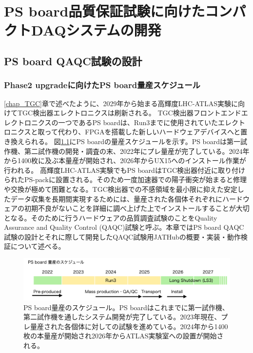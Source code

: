 \chapter{PS board品質保証試験に向けたコンパクトDAQシステムの開発}
\label{chap_QAQC}

\section{PS board QAQC試験の設計}
\label{sec_QAQCdesign}
\subsection{Phase2 upgradeに向けたPS board量産スケジュール}
\label{subsec_PSBschedule}
\ref{chap_TGC}章で述べたように、2029年から始まる高輝度LHC-ATLAS実験に向けてTGC検出器エレクトロニクスは刷新される。
TGC検出器フロントエンドエレクトロニクスの一つであるPS boardは、Run3までに使用されていたエレクトロニクスと取って代わり、FPGAを搭載した新しいハードウェアデバイスへと置き換えられる。
図\ref{PSBschedule}にPS boardの量産スケジュールを示す。PS boardは第一試作機、第二試作機の開発・調査の末、2022年にプレ量産が完了している。2024年から1400枚に及ぶ本量産が開始され、2026年からUX15へのインストール作業が行われる。
高輝度LHC-ATLAS実験でもPS boardはTGC検出器付近に取り付けられたPS-packに設置される。そのため一度加速器での陽子衝突が始まると修理や交換が極めて困難となる。TGC検出器での不感領域を最小限に抑えた安定したデータ収集を長期間実現するためには、量産された各個体それぞれにハードウェアの初期不良がないことを詳細に調べ上げた上でインストールすることが大切となる。そのために行うハードウェアの品質調査試験のことをQuality Assurance and Quality Control (QAQC)試験と呼ぶ。本章ではPS board QAQC試験の設計とそれに際して開発したQAQC試験用JATHubの概要・実装・動作検証について述べる。

\begin{figure} 
\centering
\includegraphics[width=16cm]{fig/QAQC/PSBschedule.png}
\caption[PS board量産のスケジュール]{PS board量産のスケジュール。PS boardはこれまでに第一試作機、第二試作機を通したシステム開発が完了している。2023年現在、プレ量産された各個体に対しての試験を進めている。2024年から1400枚の本量産が開始され2026年からATLAS実験室への設置が開始される。}
\label{PSBschedule}
\end{figure}

